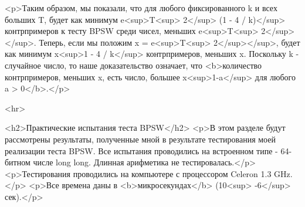 <p>Таким образом, мы показали, что для любого фиксированного k и всех больших T, будет как минимум e<sup>T<sup> 2</sup> (1 - 4 / k)</sup> контрпримеров к тесту BPSW среди чисел, меньших e<sup>T<sup> 2</sup></sup>. Теперь, если мы положим x = e<sup>T<sup> 2</sup></sup>, будет как минимум x<sup>1 - 4 / k</sup> контрпримеров, меньших x. Поскольку k - случайное число, то наше доказательство означает, что <b>количество контрпримеров, меньших x, есть число, большее x<sup>1-a</sup> для любого a > 0</b>.</p>

<hr>

<h2>Практические испытания теста BPSW</h2>
<p>В этом разделе будут рассмотрены результаты, полученные мной в результате тестирования моей реализации теста BPSW. Все испытания проводились на встроенном типе - 64-битном числе long long. Длинная арифметика не тестировалась.</p>
<p>Тестирования проводились на компьютере с процессором Celeron 1.3 GHz.</p>
<p>Все времена даны в <b>микросекундах</b> (10<sup> -6</sup> сек).</p>

